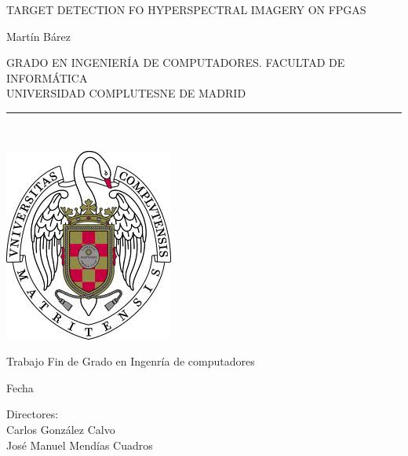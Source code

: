 \begin{center}

   \vspace{1cm}


   {\Large TARGET DETECTION FO HYPERSPECTRAL IMAGERY ON FPGAS}\\

   \vspace{0.5cm}

   \vspace{0.5cm}


   {\large Martín Bárez}\\

   \vspace{0.5cm}


   GRADO EN INGENIERÍA DE COMPUTADORES. FACULTAD DE INFORMÁTICA\\
   UNIVERSIDAD COMPLUTESNE DE MADRID \\


   \vspace{0.65cm}
   \rule{2in}{0.5pt}\\
   \vspace{0.85cm}

  \includegraphics[height=2.5in]{figures/escudo.jpg}
  

   \vspace{0.5cm}
Trabajo Fin de Grado en Ingenría de computadores

   \vspace{0.5cm}



  Fecha\\
   \vspace{1cm}

\end{center}

{\raggedleft
Directores:\\
   \vspace{ 1cm}
Carlos González Calvo\\
José Manuel Mendías Cuadros\\
}